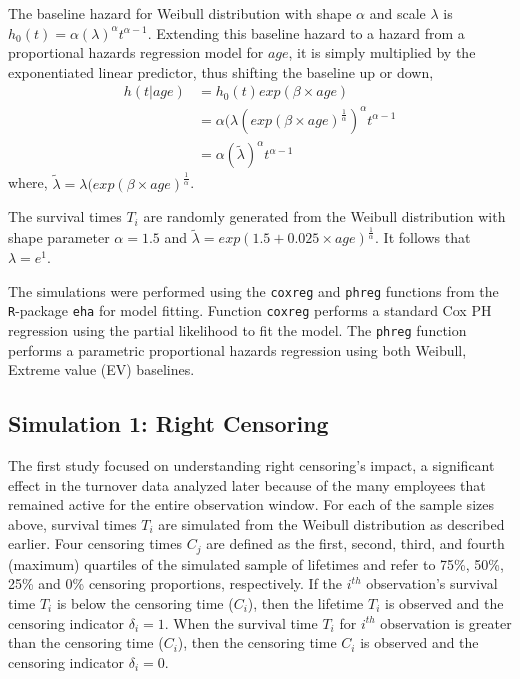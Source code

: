 The baseline hazard for Weibull distribution with shape $\alpha$ and scale $\lambda$ is $h_0(t)=\alpha(\lambda)^\alpha t^{\alpha-1}$.  Extending this baseline hazard to a hazard from a proportional hazards regression model for $age$, it is simply multiplied by the exponentiated linear predictor, thus shifting the baseline up or down,
 \begin{equation} \label{eq:weibull}
 \begin{split}%
 h(t|age) & =h_0(t)exp(\beta \times age) \\
 &=\alpha (\lambda (exp(\beta \times age)^{\frac{1}{\alpha}})^\alpha t^{\alpha-1} \\
 &=\alpha(\tilde{\lambda} )^\alpha t^{\alpha-1}
 \end{split}
 \end{equation}
 where, $\tilde{\lambda}=\lambda (exp(\beta \times age)^{\frac{1}{\alpha}}$.
 
The survival times $T_i$ are randomly generated from the Weibull distribution with shape parameter $\alpha=1.5$ and $\tilde{\lambda}=exp(1.5 +0.025 \times age)^{\frac{1}{\alpha}}$.  It follows that $\lambda = e^1$.
 
 The simulations were performed using the {\tt coxreg} and {\tt phreg} functions from the {\tt R}-package {\tt eha} \citep{eha} for model fitting.  Function {\tt coxreg} performs a standard Cox PH regression using the partial likelihood to fit the model.  The {\tt phreg} function performs a parametric proportional hazards regression using both Weibull, Extreme value (EV) baselines.
\subsection{Simulation 1: Right Censoring} \label{rightcensor.sim1}

The first study focused on understanding right censoring's impact, a significant effect in the turnover data analyzed later because of the many employees that remained active for the entire observation window. For each of the sample sizes above, survival times $T_i$ are simulated from the Weibull distribution as described earlier. Four censoring times $C_j$ are defined as the first, second, third, and fourth (maximum) quartiles of the simulated sample of lifetimes and refer to 75\%, 50\%, 25\% and 0\% censoring proportions, respectively. If the $i^{th}$ observation's survival time $T_i$ is below the censoring time ($C_i$), then the lifetime $T_i$ is observed and the censoring indicator $\delta_i=1$. When the survival time $T_i$ for $i^{th}$ observation is greater than the censoring time ($C_i$), then the censoring time $C_i$ is observed and the censoring indicator $\delta_i = 0$.


